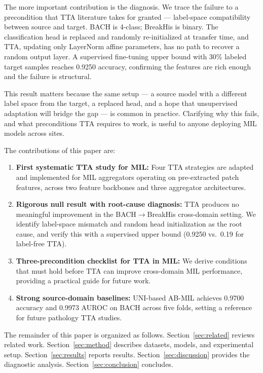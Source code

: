 \documentclass[conference]{IEEEtran}
\begin{document}
The more important contribution is the diagnosis. We trace the failure to a precondition that TTA literature takes for granted --- label-space compatibility between source and target. BACH is 4-class; BreakHis is binary. The classification head is replaced and randomly re-initialized at transfer time, and TTA, updating only LayerNorm affine parameters, has no path to recover a random output layer. A supervised fine-tuning upper bound with 30\% labeled target samples reaches 0.9250 accuracy, confirming the features are rich enough and the failure is structural.

This result matters because the same setup --- a source model with a different label space from the target, a replaced head, and a hope that unsupervised adaptation will bridge the gap --- is common in practice. Clarifying why this fails, and what preconditions TTA requires to work, is useful to anyone deploying MIL models across sites.

The contributions of this paper are:

\begin{enumerate}
    \item \textbf{First systematic TTA study for MIL:} Four TTA strategies are adapted and implemented for MIL aggregators operating on pre-extracted patch features, across two feature backbones and three aggregator architectures.

    \item \textbf{Rigorous null result with root-cause diagnosis:} TTA produces no meaningful improvement in the BACH$\rightarrow$BreakHis cross-domain setting. We identify label-space mismatch and random head initialization as the root cause, and verify this with a supervised upper bound (0.9250 vs.\ 0.19 for label-free TTA).

    \item \textbf{Three-precondition checklist for TTA in MIL:} We derive conditions that must hold before TTA can improve cross-domain MIL performance, providing a practical guide for future work.

    \item \textbf{Strong source-domain baselines:} UNI-based AB-MIL achieves 0.9700 accuracy and 0.9973 AUROC on BACH across five folds, setting a reference for future pathology TTA studies.
\end{enumerate}

The remainder of this paper is organized as follows. Section~\ref{sec:related} reviews related work. Section~\ref{sec:method} describes datasets, models, and experimental setup. Section~\ref{sec:results} reports results. Section~\ref{sec:discussion} provides the diagnostic analysis. Section~\ref{sec:conclusion} concludes.
\end{document}
